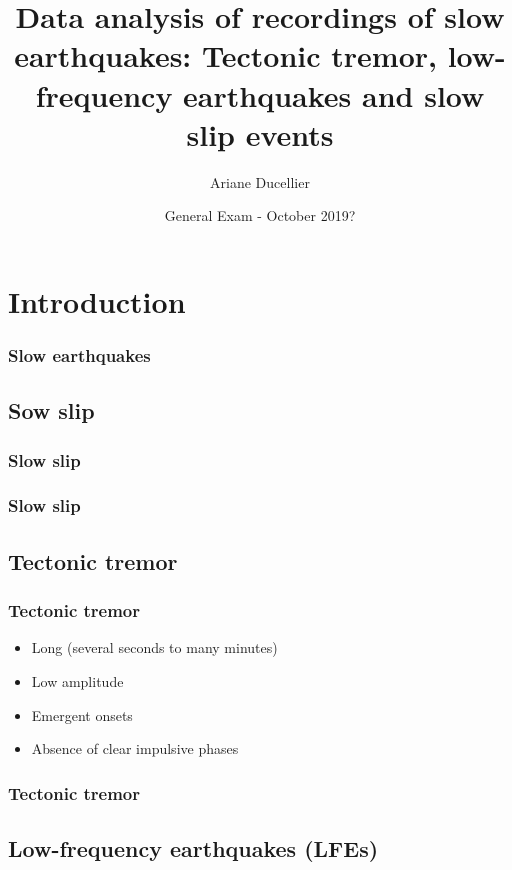 \documentclass{beamer}
\title[Data analysis of recordings of slow earthquakes]{Data analysis of recordings of slow earthquakes: Tectonic tremor, low-frequency earthquakes and slow slip events}
\author{Ariane Ducellier}
\institute{University of Washington}
\date{General Exam - October 2019?}
\begin{document}
	\begin{frame}
		\titlepage
	\end{frame}

	\section{Introduction}

	\begin{frame}
		\frametitle{Slow earthquakes}
	\end{frame}

	\subsection{Sow slip}

	\begin{frame}
		\frametitle{Slow slip}
	\end{frame}

	\begin{frame}
		\frametitle{Slow slip}
	\end{frame}

	\subsection{Tectonic tremor}

	\begin{frame}
		\frametitle{Tectonic tremor}
		\begin{itemize}
			\item Long (several seconds to many minutes)
			\item Low amplitude
			\item Emergent onsets
			\item Absence of clear impulsive phases
		\end{itemize}
	\end{frame}

	\begin{frame}
		\frametitle{Tectonic tremor}
	\end{frame}

	\subsection{Low-frequency earthquakes (LFEs)}
\end{document}
